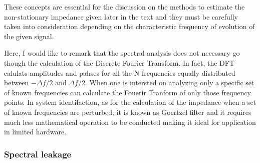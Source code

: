 These concepts are essential for the discussion on the methods to estimate the non-stationary impedance given later in the text and they must be carefully taken into consideration depending on the characteristic frequency of evolution of the given signal.

Here, I would like to remark that the spectral analysis does not necessary go though the calculation of the Discrete Fourier Transform. In fact, the DFT calulats amplitudes and pahses for all the N frequencies equally distributed between $-\Delta f/2$ and $\Delta f/2$. When one is intersted on analyzing only a specific set of known frequencies can calculate the Fouerir Tranform of only those frequency points. In system identifaction, as for the calculation of the impedance when a set of known frequencies are perturbed, it is known as Goertzel filter and it requires much less mathematical operation to be conducted making it ideal for application in limited hardware.

\subsubsection{Spectral leakage}

